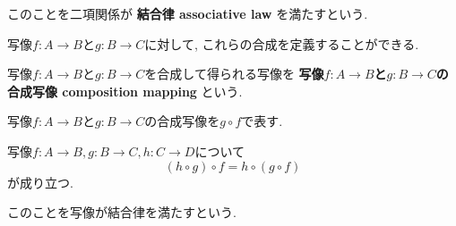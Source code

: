 このことを二項関係が
{\bf 結合律 associative law}
を満たすという.
\begin{Prop}
写像$f:A\rightarrow B$と$g:B\rightarrow C$に対して,
これらの合成を定義することができる.
\end{Prop}

\begin{Def}
写像$f:A\rightarrow B$と$g:B\rightarrow C$を合成して得られる写像を
{\bf 写像$f:A\rightarrow B$と$g:B\rightarrow C$の
合成写像 composition mapping}
という.
\end{Def}
\begin{Notation}
写像$f:A\rightarrow B$と$g:B\rightarrow C$の合成写像を$g\circ f$で表す.
\end{Notation}
\begin{Prop}
写像$f:A\rightarrow B, g:B\rightarrow C,
h:C\rightarrow D$について
\[
(h\circ g)\circ f=h\circ(g\circ f)
\]
が成り立つ.
\end{Prop}

このことを写像が結合律を満たすという.


\begin{comment}
\section{命題の証明}
\begin{color}{red}このセクションはレビュー対象外\end{color}

命題1.26の証明
\begin{proof}
\end{proof}
命題1.27の証明
\begin{proof}
\end{proof}
命題1.30の証明
\begin{proof}
\end{proof}
\end{comment}